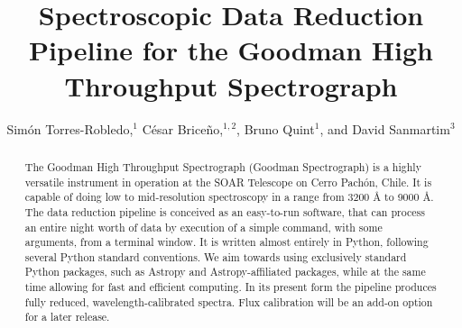 \documentclass[11pt,twoside]{article}
\begin{document}
\title{Spectroscopic Data Reduction Pipeline for the Goodman High Throughput Spectrograph}

\author{Sim\'on Torres-Robledo,$^1$ C\'esar Brice\~no,$^{1, 2}$, Bruno Quint$^1$, and David Sanmartim$^3$
}


\begin{abstract}
The Goodman High Throughput Spectrograph (Goodman Spectrograph) is a highly
versatile instrument in operation at the SOAR Telescope on Cerro Pach\'on, Chile.
It is capable of doing low to mid-resolution spectroscopy in a range from 3200 \AA{}
to 9000 \AA{}. The data reduction pipeline is conceived as an easy-to-run software,
that can process an entire night worth of data by execution of a simple command,
with some arguments, from a terminal window. It is written almost entirely in
Python, following several Python standard conventions.
We aim towards using exclusively standard Python packages, such as Astropy and
Astropy-affiliated packages, while at the same time allowing for fast and
efficient computing.
In its present form the pipeline produces fully reduced, wavelength-calibrated
spectra. Flux calibration will be an add-on option for a later release.
\end{abstract}
\end{document}
